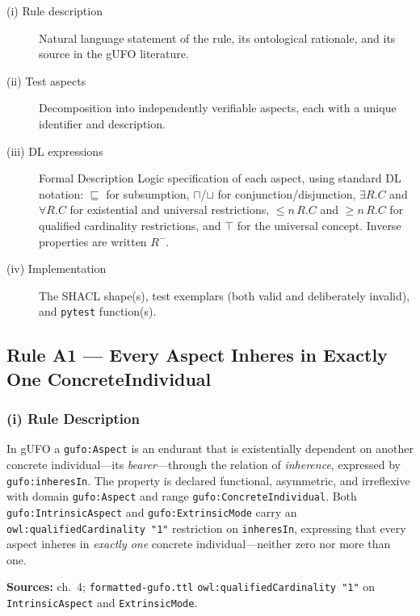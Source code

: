 \documentclass[12pt,a4paper]{article}
\newcommand{\gufoclass}[1]{\nolinkurl{gufo:#1}}
\newcommand{\gufoprop}[1]{\nolinkurl{gufo:#1}}
\begin{document}
\begin{description}
  \item[(i) Rule description] Natural language statement of the rule, its
    ontological rationale, and its source in the gUFO literature.
  \item[(ii) Test aspects] Decomposition into independently verifiable
    aspects, each with a unique identifier and description.
  \item[(iii) DL expressions] Formal Description Logic specification of each
    aspect, using standard DL notation: $\sqsubseteq$ for subsumption,
    $\sqcap$/$\sqcup$ for conjunction/disjunction, $\exists R.C$ and
    $\forall R.C$ for existential and universal restrictions, $\leq n\,R.C$
    and $\geq n\,R.C$ for qualified cardinality restrictions, and $\top$ for
    the universal concept. Inverse properties are written $R^-$.
  \item[(iv) Implementation] The SHACL shape(s), test exemplars (both valid
    and deliberately invalid), and \texttt{pytest} function(s).
\end{description}

\bigskip

\subsection{Rule A1 --- Every Aspect Inheres in Exactly One ConcreteIndividual}
\label{sec:rule-a1}

\subsubsection*{(i) Rule Description}

In gUFO a \gufoclass{Aspect} is an endurant that is existentially dependent on
another concrete individual---its \emph{bearer}---through the relation of
\emph{inherence}, expressed by \gufoprop{inheresIn}. The property is declared
functional, asymmetric, and irreflexive with domain \gufoclass{Aspect} and range
\gufoclass{ConcreteIndividual}. Both \gufoclass{IntrinsicAspect} and
\gufoclass{ExtrinsicMode} carry an \nolinkurl{owl:qualifiedCardinality "1"}
restriction on \texttt{inheresIn}, expressing that every aspect inheres in
\emph{exactly one} concrete individual---neither zero nor more than one.

\textbf{Sources:} \citet{guizzardi2005} ch.~4; \texttt{formatted-gufo.ttl}
\nolinkurl{owl:qualifiedCardinality "1"} on \texttt{IntrinsicAspect} and
\texttt{ExtrinsicMode}.
\end{document}
